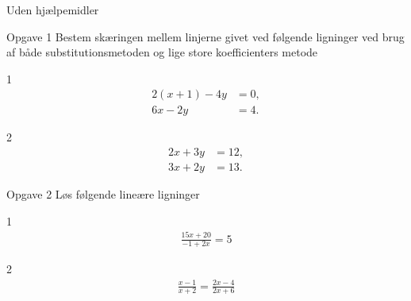 \documentclass[12pt,x11names,a4paper]{article}
\begin{document}
\newpage

\begin{center}
	\LARGE
	Uden hjælpemidler
\end{center}
\begin{opgavetekst}{Opgave 1}
	Bestem skæringen mellem linjerne givet ved følgende ligninger ved brug af både substitutionsmetoden og 
	lige store koefficienters metode
\end{opgavetekst}
\begin{delopgave}{}{1}
	\begin{align*}
		2(x + 1) - 4y &= 0,\\
		6x - 2y &= 4.
	\end{align*}	 
\end{delopgave}
\begin{delopgave}{}{2}
	\begin{align*}
		2x + 3y &= 12, \\
		3x + 2y &= 13.
	\end{align*}
\end{delopgave}
\begin{opgavetekst}{Opgave 2}
	Løs følgende lineære ligninger
\end{opgavetekst}
\begin{delopgave}{}{1}
	\begin{align*}
		\frac{15x + 20}{-1 + 2x} = 5
	\end{align*}
\end{delopgave}
\begin{delopgave}{}{2}
	\begin{align*}
		\frac{x-1}{x+2} = \frac{2x-4}{2x+6}
	\end{align*}
\end{delopgave}

\newpage
\end{document}
